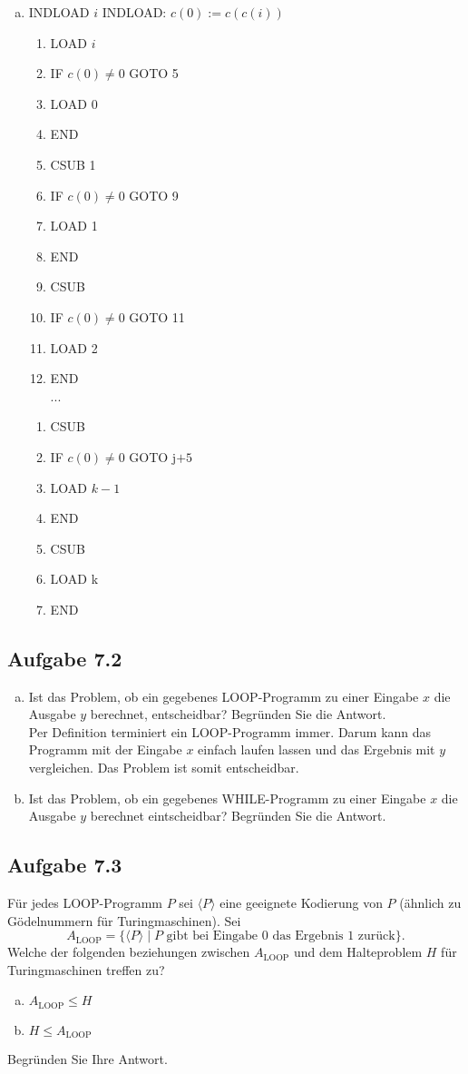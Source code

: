 \begin{enumerate}[(a)]
	\item INDLOAD $i$
	INDLOAD: $c(0) := c(c(i))$
	\begin{enumerate}[ 1.]
		\item LOAD $i$
		\item IF $c(0) \neq 0$ GOTO 5
		\item LOAD 0
		\item END
		\item CSUB 1
		\item IF $c(0) \neq 0$ GOTO 9
		\item LOAD 1
		\item END
		\item CSUB
		\item IF $c(0) \neq 0$ GOTO 11
		\item LOAD 2
		\item END\\
		...
	\end{enumerate}
	\begin{enumerate}[j+1]
		\item CSUB
		\item IF $c(0) \neq 0$ GOTO j$+5$
		\item LOAD $k-1$
		\item END
		\item CSUB
		\item LOAD k
		\item END
	\end{enumerate}
\end{enumerate}

\subsection*{Aufgabe 7.2}
\begin{enumerate}[(a)]
	\item Ist das Problem, ob ein gegebenes LOOP-Programm zu einer Eingabe $x$ die Ausgabe $y$ berechnet, entscheidbar? Begründen Sie die Antwort.\\
	Per Definition terminiert ein LOOP-Programm immer. Darum kann das Programm mit der Eingabe $x$ einfach laufen lassen und das Ergebnis mit $y$ vergleichen. Das Problem ist somit entscheidbar.
	\item Ist das Problem, ob ein gegebenes WHILE-Programm zu einer Eingabe $x$ die Ausgabe $y$ berechnet eintscheidbar? Begründen Sie die Antwort.
\end{enumerate}
\subsection*{Aufgabe 7.3}
Für jedes LOOP-Programm $P$ sei $\langle P \rangle$ eine geeignete Kodierung von $P$ (ähnlich zu Gödelnummern für Turingmaschinen). Sei
$$A_{ \text{LOOP} }= \{\langle P \rangle \mid P \text{ gibt bei Eingabe 0 das Ergebnis 1 zurück}\}.$$
Welche der folgenden beziehungen zwischen $A_{\text{LOOP}}$ und dem Halteproblem $H$ für Turingmaschinen treffen zu?
\begin{enumerate}[(a)]
	\item $A_{\text{LOOP}} \leq H$
	\item $H \leq A_{\text{LOOP}}$
\end{enumerate}
Begründen Sie Ihre Antwort.
